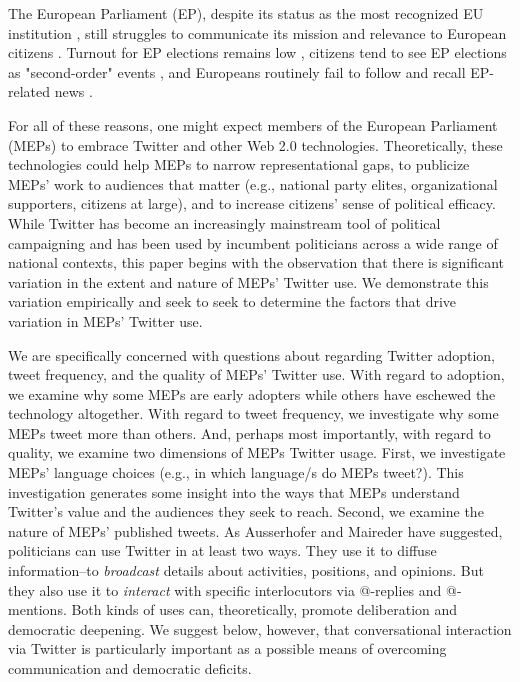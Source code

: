 \documentclass{article}\usepackage[]{graphicx}\usepackage[]{color}
\begin{document}
The European Parliament (EP), despite its status as the most recognized EU institution \cite[e.g.,]{eurobarometer.2014}, still struggles to communicate its mission and relevance to European citizens \citep*{anderson.mcleod.2004}. Turnout for EP elections remains low \citep*{hobolt.2014, franklin.hobolt.2011, mattila.2013}, citizens tend to see EP elections as "second-order" events \citep*{hix.marsh.2007, schmitt.2005}, and Europeans routinely fail to follow and recall EP-related news \citep*{eurobarometer.2013}. 
  	
		For all of these reasons, one might expect members of the European Parliament (MEPs) to embrace Twitter and other Web 2.0 technologies. Theoretically, these technologies could help MEPs to narrow representational gaps, to publicize MEPs' work to audiences that matter (e.g., national party elites, organizational supporters, citizens at large), and to increase citizens' sense of political efficacy. While Twitter has become an increasingly mainstream tool of political campaigning and has been used by incumbent politicians across a wide range of national contexts, this paper begins with the observation that there is significant variation in the extent and nature of MEPs' Twitter use. We demonstrate this variation empirically and seek to seek to determine the factors that drive variation in MEPs' Twitter use.
		
		We are specifically concerned with questions about regarding Twitter adoption, tweet frequency, and the quality of MEPs' Twitter use. With regard to adoption, we examine why some MEPs are early adopters while others have eschewed the technology altogether.  With regard to tweet frequency, we investigate why some MEPs tweet more than others.  And, perhaps most importantly, with regard to quality, we examine two dimensions of MEPs Twitter usage. First, we investigate MEPs' language choices (e.g., in which language/s do MEPs tweet?). This investigation generates some insight into the ways that MEPs understand Twitter's value and the audiences they seek to reach. Second, we examine the nature of MEPs' published tweets.  As Ausserhofer and Maireder  have suggested, politicians can use Twitter in at least two ways. They use it to diffuse information--to \emph{broadcast} details about activities, positions, and opinions. But they also use it to \emph{interact} with specific interlocutors via @-replies and @-mentions. Both kinds of uses can, theoretically, promote deliberation and democratic deepening. We suggest below, however, that conversational interaction via Twitter is particularly important as a possible means of overcoming communication and democratic deficits.
		
\end{document}
